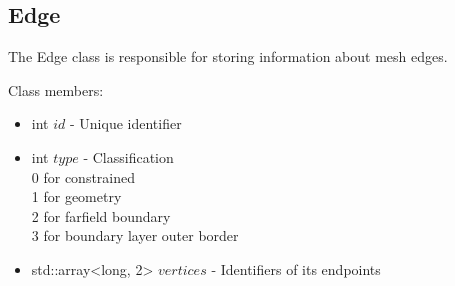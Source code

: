 \documentclass[manuscript, screen]{acmart}
\begin{document}
\subsection{Edge}
The Edge class is responsible for storing information about mesh edges.

Class members:
\begin{itemize}
\item int $id$ - Unique identifier
\item int $type$ - Classification\\
0 for constrained\\
1 for geometry\\
2 for farfield boundary\\
3 for boundary layer outer border
\item std::array<long, 2> $vertices$ - Identifiers of its endpoints
\end{itemize}
\end{document}
